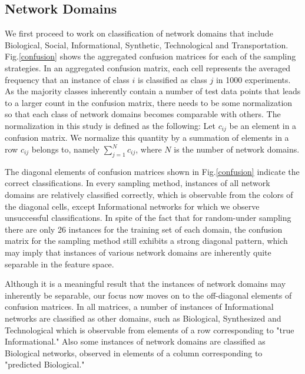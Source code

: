  
\subsection{Network Domains} 
We first proceed to work on classification of network domains that include Biological, Social, Informational, Synthetic, Technological and Transportation. Fig.\ref{confusion} shows the aggregated confusion matrices for each of the sampling strategies. In an aggregated confusion matrix, each cell represents the averaged frequency that an instance of class $i$ is classified as class $j$ in 1000 experiments. As the majority classes inherently contain a number of test data points that leads to a larger count in the confusion matrix, there needs to be some normalization so that each class of network domains becomes comparable with others. The normalization in this study is defined as the following: Let $c_{ij}$ be an element in a confusion matrix. We normalize this quantity by a summation of elements in a row $c_{ij}$ belongs to, namely $\sum_{j=1}^N c_{ij}$, where $N$ is the number of network domains. 

The diagonal elements of confusion matrices shown in Fig.\ref{confusion} indicate the correct classifications. In every sampling method, instances of all network domains are relatively classified correctly, which is observable from the colors of the diagonal cells, except Informational networks for which we observe unsuccessful classifications. In spite of the fact that for random-under sampling there are only 26 instances for the training set of each domain, the confusion matrix for the sampling method still exhibits a strong diagonal pattern, which may imply that instances of various network domains are inherently quite separable in the feature space.

Although it is a meaningful result that the instances of network domains may inherently be separable, our focus now moves on to the off-diagonal elements of confusion matrices. In all matrices, a number of instances of Informational networks are classified as other domains, such as Biological, Synthesized and Technological which is observable from elements of a row corresponding to  "true Informational." Also some instances of network domains are classified as Biological networks, observed in elements of a column corresponding to "predicted Biological." 

